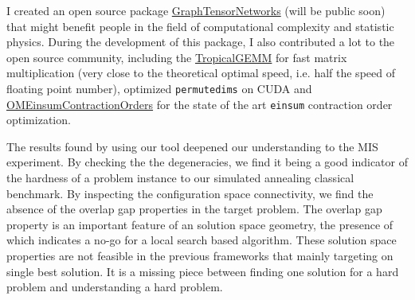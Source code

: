 \documentclass[a4paper]{article}
\newcommand{\<}{\langle}
\renewcommand{\>}{\rangle}
\begin{document}



I created an open source package \href{https://github.com/Happy-Diode/GraphTensorNetworks.jl}{GraphTensorNetworks} (will be public soon) that might benefit people in the field of computational complexity and statistic physics.
During the development of this package, I also contributed a lot to the open source community, including the \href{https://github.com/TensorBFS/TropicalGEMM.jl/}{TropicalGEMM} for fast matrix multiplication (very close to the theoretical optimal speed, i.e. half the speed of floating point number), optimized \texttt{permutedims} on CUDA and \href{https://github.com/TensorBFS/OMEinsumContractionOrders.jl}{OMEinsumContractionOrders} for the state of the art \texttt{einsum} contraction order optimization.

The results found by using our tool deepened our understanding to the MIS experiment. By checking the the degeneracies, we find it being a good indicator of the hardness of a problem instance to our simulated annealing classical benchmark.
By inspecting the configuration space connectivity, we find the absence of the overlap gap properties in the target problem.
The overlap gap property is an important feature of an solution space geometry, the presence of which indicates a no-go for a local search based algorithm.
These solution space properties are not feasible in the previous frameworks that mainly targeting on single best solution.
It is a missing piece between finding one solution for a hard problem and understanding a hard problem.
\end{document}
